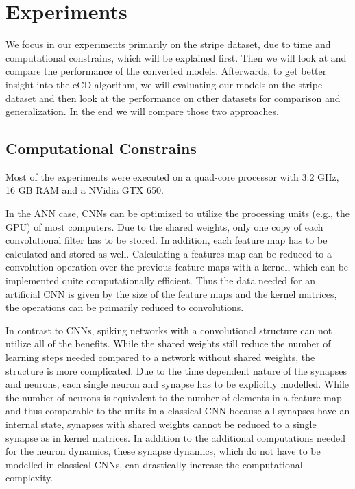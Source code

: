\section{Experiments} \label{c:exps}

We focus in our experiments primarily on the stripe dataset, due to time and computational constrains, which will be explained first.
Then we will look at and compare the performance of the converted models.
Afterwards, to get better insight into the eCD algorithm, we will evaluating our models on the stripe dataset and then look at the performance on other datasets for comparison and generalization.
In the end we will compare those two approaches.

\subsection{Computational Constrains} \label{c:compconstr}

Most of the experiments were executed on a quad-core processor with 3.2 GHz, 16 GB RAM and a NVidia GTX 650.

In the ANN case, CNNs can be optimized to utilize the processing units (e.g., the GPU) of most computers. 
Due to the shared weights, only one copy of each convolutional filter has to be stored. 
In addition, each feature map has to be calculated and stored as well.
Calculating a features map can be reduced to a convolution operation over the previous feature maps with a kernel, which can be implemented quite computationally efficient.
Thus the data needed for an artificial CNN is given by the size of the feature maps and the kernel matrices, the operations can be primarily reduced to convolutions.  

In contrast to CNNs, spiking networks with a convolutional structure can not utilize all of the benefits.
While the shared weights still reduce the number of learning steps needed compared to a network without shared weights, the structure is more complicated.
Due to the time dependent nature of the synapses and neurons, each single neuron and synapse has to be explicitly modelled.
While the number of neurons is equivalent to the number of elements in a feature map and thus comparable to the units in a classical CNN because all synapses have an internal state, synapses with shared weights cannot be reduced to a single synapse as in kernel matrices.
In addition to the additional computations needed for the neuron dynamics, these synapse dynamics, which do not have to be modelled in classical CNNs, can drastically increase the computational complexity.   

